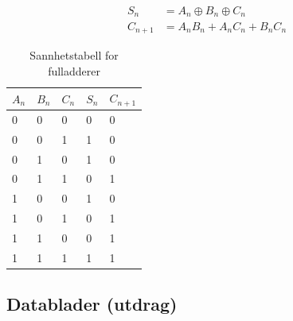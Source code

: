 \documentclass[11pt, a4paper, norwegian]{article}
\begin{document}
\begin{align}
S_n &= A_n \oplus B_n \oplus C_n \label{eq_sumFA}\\
C_{n+1} &= A_n B_n + A_n C_n + B_n C_n \label{eq_menteFA}
\end{align}

\begin{table}[h]
      \centering
        \caption{Sannhetstabell for fulladderer}
        \label{tbl_FullAdd}
        \begin{tabular}{|lll||ll|}
        \hline
        $A_n$ & $B_n$ & $C_n$ & $S_n$ & $C_{n+1}$ \\ \hline
        0 & 0 & 0 & 0 & 0\\
        0 & 0 & 1 & 1 & 0\\
        0 & 1 & 0 & 1 & 0\\
        0 & 1 & 1 & 0 & 1\\
        1 & 0 & 0 & 1 & 0\\
        1 & 0 & 1 & 0 & 1\\
        1 & 1 & 0 & 0 & 1\\
        1 & 1 & 1 & 1 & 1\\ \hline
      \end{tabular}
\end{table}

\subsection{Datablader (utdrag)}


\end{document}
